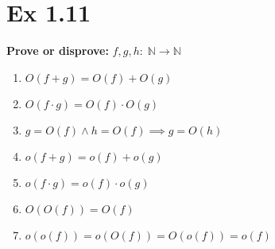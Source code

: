 \section*{Ex 1.11}
\begin{mdframed}
	\textbf{Prove or disprove:}
    $f, g, h :\; \mathbb N \to \mathbb N$
	\begin{enumerate}
        \item $O(f+g) = O(f) + O(g)$
        \item $O(f\cdot g) = O(f) \cdot O(g)$
        \item $g=O(f) \wedge h=O(f) \implies g = O(h)$
        \item $o(f+g) = o(f) + o(g)$
        \item $o(f\cdot g) = o(f) \cdot o(g)$
        \item $O(O(f)) = O(f)$
        \item $o(o(f)) = o(O(f)) = O(o(f)) = o(f)$
    \end{enumerate}
\end{mdframed}

